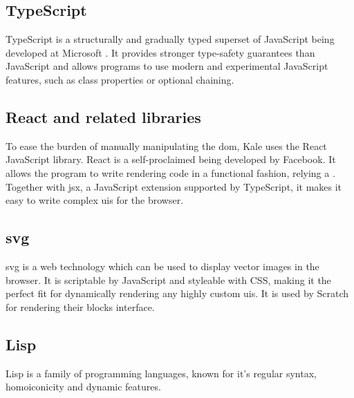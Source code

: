 \subsection{TypeScript}
TypeScript is a structurally and gradually typed superset of JavaScript being
developed at Microsoft \cite{Typescript}. It provides stronger type-safety
guarantees than JavaScript and allows programs to use modern and experimental
JavaScript features, such as class properties or optional chaining. 


\subsection{React and related libraries}
To ease the burden of manually manipulating the \ac{dom}, Kale uses the React
\cite{React} JavaScript library. React is a self-proclaimed  being developed by Facebook. It
allows the program to write rendering
code in a functional fashion, relying a . Together with \ac{jsx}, a JavaScript extension supported by
TypeScript, it makes it easy to write complex \acp{ui} for the browser.

\subsection{\acf{svg}}
\ac{svg} is a web technology which can be used to display vector images in the
browser. It is scriptable by JavaScript and styleable with CSS, making it the
perfect fit for dynamically rendering any highly custom \acp{ui}. It is used by
Scratch for rendering their blocks interface.

\subsection{Lisp}
Lisp is a family of programming languages, known for it's regular syntax,
homoiconicity and dynamic features.